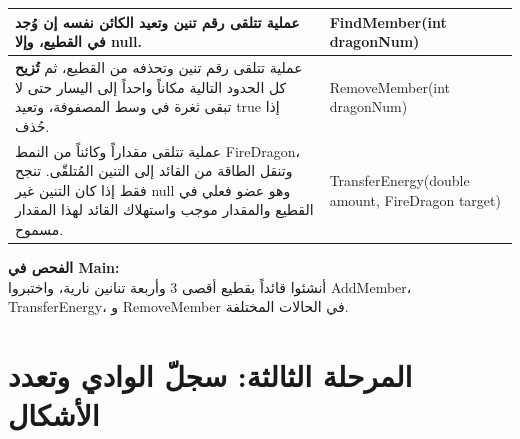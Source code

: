 \documentclass[14pt]{extarticle}
\begin{document}
\begin{enumerate}[resume, label=\textbf{تمرين \arabic*:}, wide=0pt, leftmargin=*, itemsep=2.2em]
{\begin{tabular}{|>{\raggedleft\arraybackslash}p{}|>{\raggedright\arraybackslash}p{}|}
    عملية تتلقى رقم تنين وتعيد الكائن نفسه إن وُجد في القطيع، وإلا \textenglish{null}. & \textenglish{FindMember(int dragonNum)} \\
    \hline
    عملية تتلقى رقم تنين وتحذفه من القطيع، ثم \textbf{تُزيح} كل الحدود التالية مكاناً واحداً إلى اليسار حتى لا تبقى ثغرة في وسط المصفوفة، وتعيد \textenglish{true} إذا حُذف. & \textenglish{RemoveMember(int dragonNum)} \\
    \hline
    عملية تتلقى مقداراً وكائناً من النمط \textenglish{FireDragon}، وتنقل الطاقة من القائد إلى التنين المُتلقّى. تنجح فقط إذا كان التنين غير \textenglish{null} وهو عضو فعلي في القطيع والمقدار موجب واستهلاك القائد لهذا المقدار مسموح. & \textenglish{TransferEnergy(double amount, FireDragon target)} \\
    \hline
    \end{tabular}
    \par} %

    \vspace{2em}
    \noindent \textbf{الفحص في \textenglish{Main}:} \\
    أنشئوا قائداً بقطيع أقصى $3$ وأربعة تنانين نارية، واختبروا \textenglish{AddMember}، \textenglish{TransferEnergy}، و \textenglish{RemoveMember} في الحالات المختلفة.

\end{enumerate}

\clearpage

\section*{المرحلة الثالثة: سجلّ الوادي وتعدد الأشكال}
\end{document}
